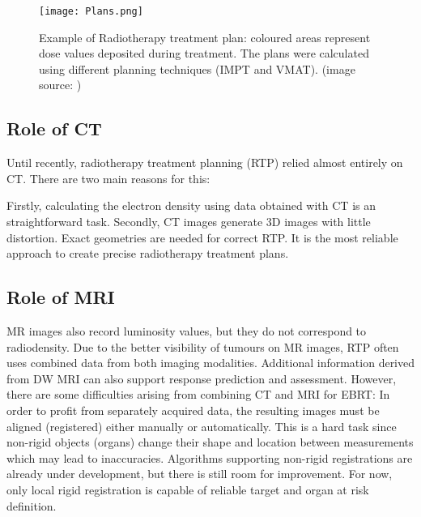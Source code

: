 \begin{figure}[!tbh]
	\centering
	\texttt{[image: Plans.png]}
	\caption{Example of Radiotherapy treatment plan: coloured areas represent dose values deposited during treatment. The plans were calculated using different planning techniques (IMPT and VMAT). (image source: \cite{piotr})}
	\label{fig:plan}
\end{figure}

\clearpage



\subsection{Role of CT}

Until recently, radiotherapy treatment planning (RTP) relied almost entirely on CT.
There are two main reasons for this:

Firstly, calculating the electron density using data obtained with CT is an straightforward task.
Secondly, CT images generate 3D images with little distortion. Exact geometries are needed for correct RTP.
It is the most reliable approach to create precise radiotherapy treatment plans. \cite{Constantinou2012, Schneider1996}

\subsection{Role of MRI}
MR images also record luminosity values, but they do not correspond to radiodensity.
Due to the better visibility of tumours on MR images, RTP often uses combined data from both imaging modalities.
Additional information derived from DW MRI can also support response prediction and assessment.
However, there are some difficulties arising from combining CT and MRI for EBRT:
In order to profit from separately acquired data, the resulting images must be aligned (registered) either manually or automatically.
This is a hard task since non-rigid objects (organs) change their shape and location between measurements which may lead to inaccuracies.
Algorithms supporting non-rigid registrations are already under development, but there is still room for improvement.
For now, only local rigid registration is capable of reliable target and organ at risk definition.

